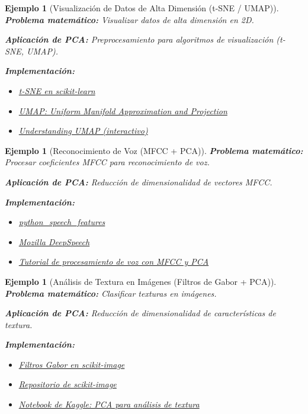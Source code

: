 \documentclass[11pt]{article}
\theoremstyle{plain}
\newtheorem{example}[theorem]{Ejemplo}
\begin{document}
\begin{example}[Visualización de Datos de Alta Dimensión (t-SNE / UMAP)]
\label{ej:visualizacion}
\textbf{Problema matemático:} Visualizar datos de alta dimensión en 2D.

\textbf{Aplicación de PCA:} Preprocesamiento para algoritmos de visualización (t-SNE, UMAP).

\textbf{Implementación:}
\begin{itemize}
    \item \href{https://scikit-learn.org/stable/modules/generated/sklearn.manifold.TSNE.html}{t-SNE en scikit-learn}
    \item \href{https://github.com/lmcinnes/umap}{UMAP: Uniform Manifold Approximation and Projection}
    \item \href{https://pair-code.github.io/understanding-umap/}{Understanding UMAP (interactivo)}
\end{itemize}
\end{example}

\begin{example}[Reconocimiento de Voz (MFCC + PCA)]
\label{ej:voz}
\textbf{Problema matemático:} Procesar coeficientes MFCC para reconocimiento de voz.

\textbf{Aplicación de PCA:} Reducción de dimensionalidad de vectores MFCC.

\textbf{Implementación:}
\begin{itemize}
    \item \href{https://github.com/jameslyons/python_speech_features}{python\_speech\_features}
    \item \href{https://github.com/mozilla/DeepSpeech}{Mozilla DeepSpeech}
    \item \href{https://haythamfayek.com/2016/04/21/speech-processing-for-machine-learning.html}{Tutorial de procesamiento de voz con MFCC y PCA}
\end{itemize}
\end{example}

\begin{example}[Análisis de Textura en Imágenes (Filtros de Gabor + PCA)]
\label{ej:textura}
\textbf{Problema matemático:} Clasificar texturas en imágenes.

\textbf{Aplicación de PCA:} Reducción de dimensionalidad de características de textura.

\textbf{Implementación:}
\begin{itemize}
    \item \href{https://scikit-image.org/docs/stable/auto_examples/features_detection/plot_gabor.html}{Filtros Gabor en scikit-image}
    \item \href{https://github.com/scikit-image/scikit-image}{Repositorio de scikit-image}
    \item \href{https://www.kaggle.com/code/kmader/pca-for-texture-analysis}{Notebook de Kaggle: PCA para análisis de textura}
\end{itemize}
\end{example}
\end{document}
